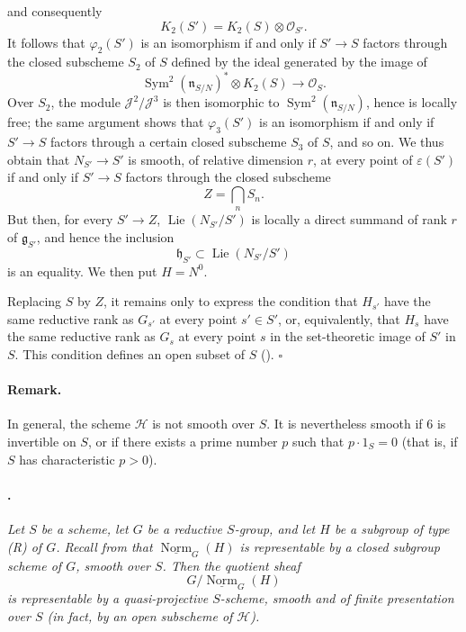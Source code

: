 and consequently
\[
  K_2(S')=K_2(S)\otimes\mathcal O_{S'}.
\]
It follows that \(\varphi_2(S')\) is an isomorphism if and only if
\(S'\to S\) factors through the closed subscheme \(S_2\) of \(S\)
defined by the ideal generated by the image of
\[
  \operatorname{Sym}^2(\mathfrak n_{S/N})^*
  \otimes K_2(S)
  \longrightarrow
  \mathcal O_S.
\]
Over \(S_2\), the module \(\mathcal J^2/\mathcal J^3\) is then
isomorphic to \(\operatorname{Sym}^2(\mathfrak n_{S/N})\), hence
is locally free; the same argument shows that
\(\varphi_3(S')\) is an isomorphism if and only if \(S'\to S\)
factors through a certain closed subscheme \(S_3\) of \(S\), and
so on. We thus obtain that \(N_{S'}\to S'\) is smooth, of relative
dimension \(r\), at every point of \(\varepsilon(S')\) if and only
if \(S'\to S\) factors through the closed subscheme
\[
  Z=\bigcap_n S_n.
\]
But then, for every \(S'\to Z\),
\(\operatorname{Lie}(N_{S'}/S')\) is locally a direct summand of
rank \(r\) of \(\mathfrak g_{S'}\), and hence the inclusion
\[
  \mathfrak h_{S'}
  \subset
  \operatorname{Lie}(N_{S'}/S')
\]
is an equality. We then put \(H=N^0\).

Replacing \(S\) by \(Z\), it remains only to express the condition
that \(H_{s'}\) have the same reductive rank as \(G_{s'}\) at every
point \(s'\in S'\), or, equivalently, that \(H_s\) have the same
reductive rank as \(G_s\) at every point \(s\) in the
set-theoretic image of \(S'\) in \(S\). This condition defines an
open subset of \(S\) \textup{()}.
\hfill\(\square\)

\paragraph{Remark.}
In general, the scheme \(\mathcal H\) is not smooth over \(S\). It
is nevertheless smooth if \(6\) is invertible on \(S\), or if
there exists a prime number \(p\) such that \(p\cdot1_S=0\)
\textup{(that is, if \(S\) has characteristic \(p>0\))}.

\paragraph{.}
\textit{Let \(S\) be a scheme, let \(G\) be a reductive
\(S\)-group, and let \(H\) be a subgroup of type \textup{(R)} of
\(G\). Recall from  that
\(\underline{\operatorname{Norm}}_G(H)\) is representable by a
closed subgroup scheme of \(G\), smooth over \(S\). Then the
quotient sheaf
\[
  G/\underline{\operatorname{Norm}}_G(H)
\]
is representable by a quasi-projective \(S\)-scheme, smooth and of
finite presentation over \(S\) \textup{(in fact, by an open
subscheme of \(\mathcal H\))}.}

